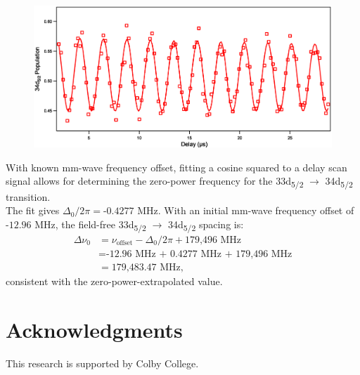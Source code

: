 \documentclass[landscape]{sciposter}
\begin{document}
\begin{multicols}{4}
\begin{figure}
\begin{center}
\includegraphics[scale = 0.8]{33d52_delay_scans.eps}
\end{center}
\end{figure}

With known mm-wave frequency offset, fitting a cosine squared to a delay scan signal allows for determining the zero-power frequency for the 33d\textsubscript{5/2} $\rightarrow$ 34d\textsubscript{5/2} transition.\\

The fit gives $\Delta_0/2\pi = \textrm{-0.4277 MHz}$. With an initial mm-wave frequency offset of $\textrm{-12.96 MHz}$, the field-free 33d\textsubscript{5/2} $\rightarrow$ 34d\textsubscript{5/2} spacing is:
\begin{align*}
\Delta \nu_0 &= \nu_{\textrm{offset}} - \Delta_0/2\pi + \textrm{179,496 MHz}\\
&= \textrm{-12.96 MHz + 0.4277 MHz + 179,496 MHz} \\ 
&= \textrm{179,483.47 MHz},
\end{align*}
consistent with the zero-power-extrapolated value.

\section*{Acknowledgments}
This research is supported by Colby College.

\end{multicols}
\end{document}
